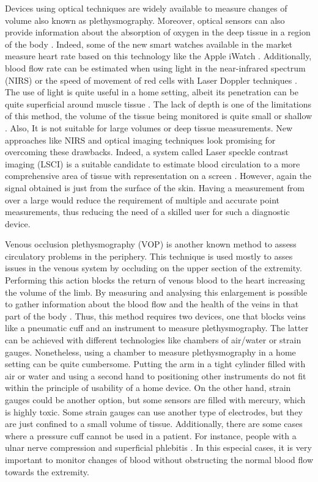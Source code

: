 Devices using optical techniques are widely available to measure changes of volume also known as plethysmography. Moreover, optical sensors can also provide information about the absorption of oxygen in the deep tissue in a region of the body \cite{holohan1996plethysmography}. Indeed, some of the new smart watches available in the market measure heart rate based on this technology like the Apple iWatch \cite{culbert2017user}. Additionally, blood flow rate can be estimated when using light in the near-infrared spectrum (NIRS) \cite{van2001performance, harel2008near, de1993noninvasive, gurley2012noninvasive} or the speed of movement of red cells with Laser Doppler techniques \cite{dirnagl1989continuous,fredriksson2007laser}. The use of light is quite useful in a home setting, albeit its penetration can be quite superficial around muscle tissue \cite{bashkatov2005optical}. The lack of depth is one of the limitations of this method, the volume of the tissue being monitored is quite small or shallow \cite{bashkatov2005optical}. Also, It is not suitable for large volumes or deep tissue measurements. New approaches like NIRS and optical imaging techniques look promising for overcoming these drawbacks. Indeed, a system called Laser speckle contrast imaging (LSCI) is a suitable candidate to estimate blood circulation to a more comprehensive area of tissue with representation on a screen \cite{briers2013laser}. However, again the signal obtained is just from the surface of the skin. Having a measurement from over a large would reduce the requirement of multiple and accurate point measurements, thus reducing the need of a skilled user for such a diagnostic device. 

Venous occlusion plethysmography (VOP) is another known method to assess circulatory problems in the periphery. This technique is used mostly to asses issues in the venous system by occluding on the upper section of the extremity. Performing this action blocks the return of venous blood to the heart increasing the volume of the limb. By measuring and analysing this enlargement is possible to gather information about the blood flow and the health of the veins in that part of the body \cite{wilkinson2001venous}. Thus, this method requires two devices, one that blocks veins like a pneumatic cuff and an instrument to measure plethysmography. The latter can be achieved with different technologies like chambers of air/water or strain gauges. Nonetheless, using a chamber to measure plethysmography in a home setting can be quite cumbersome. Putting the arm in a tight cylinder filled with air or water and using a second hand to positioning other instruments do not fit within the principle of usability of a home device. On the other hand, strain gauges could be another option, but some sensors are filled with mercury, which is highly toxic. Some strain gauges can use another type of electrodes, but they are just confined to a small volume of tissue. Additionally, there are some cases where a pressure cuff cannot be used in a patient. For instance, people with a ulnar nerve compression \cite{sy1981ulnar} and superficial phlebitis \cite{creevy1985phlebitis}. In this especial cases, it is very important to monitor changes of blood without obstructing the normal blood flow towards the extremity. 

